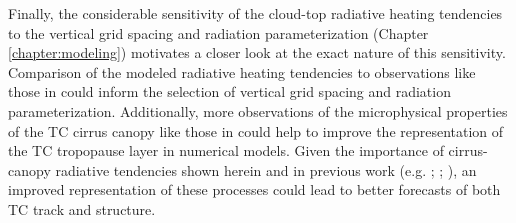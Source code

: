 Finally, the considerable sensitivity of the cloud-top radiative heating tendencies to the vertical grid spacing and radiation parameterization (Chapter \ref{chapter:modeling}) motivates a closer look at the exact nature of this sensitivity.
Comparison of the modeled radiative heating tendencies to observations like those in \cite{Garrettetal2005} could inform the selection of vertical grid spacing and radiation parameterization.
Additionally, more observations of the microphysical properties of the TC cirrus canopy like those in \cite{Heymsfield2006} could help to improve the representation of the TC tropopause layer in numerical models.
Given the importance of cirrus-canopy radiative tendencies shown herein and in previous work (e.g. \citeauthor{Fovelletal2010} \citeyear{Fovelletal2010}; \citeauthor{Buetal2014} \citeyear{Buetal2014}; \citeauthor{Fovelletal2016} \citeyear{Fovelletal2016}), an improved representation of these processes could lead to better forecasts of both TC track and structure.

